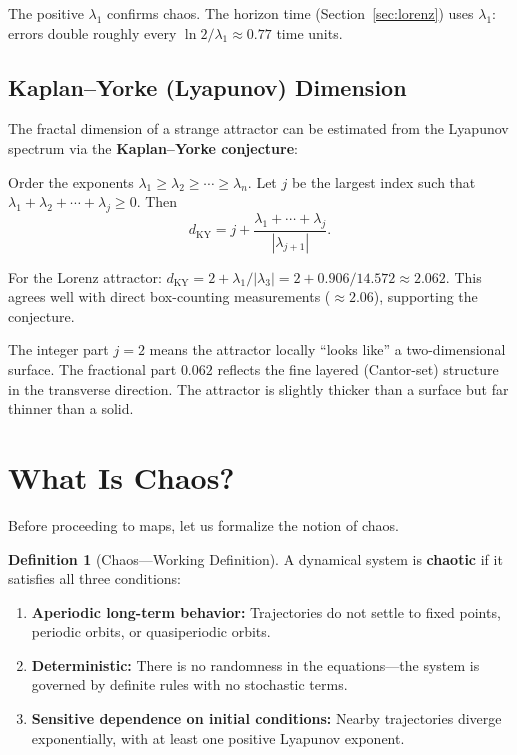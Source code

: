 \documentclass[11pt,letterpaper]{article}
\theoremstyle{definition}
\newtheorem{definition}{Definition}[section]
\theoremstyle{plain}
\theoremstyle{remark}
\begin{document}
The positive $\lambda_1$ confirms chaos.  The horizon time (Section~\ref{sec:lorenz}) uses $\lambda_1$:
errors double roughly every $\ln 2 / \lambda_1 \approx 0.77$ time units.

\subsection{Kaplan--Yorke (Lyapunov) Dimension}

The fractal dimension of a strange attractor can be estimated from the
Lyapunov spectrum via the \textbf{Kaplan--Yorke conjecture}:

\begin{keyresult}
Order the exponents $\lambda_1 \ge \lambda_2 \ge \cdots \ge \lambda_n$.
Let $j$ be the largest index such that
$\lambda_1 + \lambda_2 + \cdots + \lambda_j \ge 0$.  Then
\begin{equation}\label{eq:KY-dim}
  d_{\mathrm{KY}} = j + \frac{\lambda_1 + \cdots + \lambda_j}{|\lambda_{j+1}|}.
\end{equation}
\end{keyresult}

For the Lorenz attractor:
$d_{\mathrm{KY}} = 2 + \lambda_1/|\lambda_3| = 2 + 0.906/14.572
\approx 2.062$.
This agrees well with direct box-counting measurements ($\approx 2.06$),
supporting the conjecture.

\begin{physicalnote}
The integer part $j=2$ means the attractor locally ``looks like'' a
two-dimensional surface.  The fractional part $0.062$ reflects the
fine layered (Cantor-set) structure in the transverse direction.  The
attractor is slightly thicker than a surface but far thinner than a
solid.
\end{physicalnote}

\section{What Is Chaos?}\label{sec:chaos-defn}

Before proceeding to maps, let us formalize the notion of chaos.

\begin{definition}[Chaos---Working Definition]
A dynamical system is \textbf{chaotic} if it satisfies all three conditions:
\begin{enumerate}[leftmargin=2em]
\item \textbf{Aperiodic long-term behavior:} Trajectories do not settle
      to fixed points, periodic orbits, or quasiperiodic orbits.
\item \textbf{Deterministic:} There is no randomness in the equations---the
      system is governed by definite rules with no stochastic terms.
\item \textbf{Sensitive dependence on initial conditions:} Nearby
      trajectories diverge exponentially, with at least one positive
      Lyapunov exponent.
\end{enumerate}
\end{definition}
\end{document}

